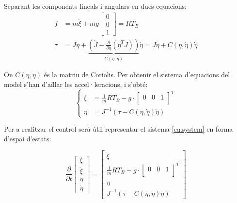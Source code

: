 \documentclass[twoside]{article}
\begin{document}
Separant les components lineals i angulars en dues equacions:
\begin{align}
f & = m \ddot{\xi} + mg \left[ \begin{array}{c}
0 \\
0 \\
1
\end{array} \right] =RT_B\\
\tau & =J \ddot{\eta} +  \underbrace{\left( \dot{J} - \frac{\partial}{\partial \dot{\eta}}(\dot{\eta}^{T}J)\right)}_{C(\eta,\dot{\eta})} \dot{\eta} =J \ddot{\eta} +  C(\eta,\dot{\eta})\dot{\eta} 
\end{align}

On $C(\eta,\dot{\eta})$ és la matriu de Coriolis. 
Per obtenir el sistema d'equacions del model s'han d'aïllar les accel·leracions, i s'obté:
\begin{equation}
\begin{cases}
\ddot{\xi} & =\frac{1}{m}RT_{B} - g \cdot \left[ \begin{array}{ccc}
0 & 0 & 1\\
\end{array} \right]^{T} \\
\ddot{\eta} & =J^{-1} \left( \tau - C(\eta,\dot{\eta})\dot{\eta}  \right)
\end{cases}
\label{eq:system}
\end{equation}

Per a realitzar el control será útil representar el sistema \ref{eq:system} en forma d'espai d'estats:

\begin{equation}
\frac{\partial}{\partial t}\left[ \begin{array}{l}
\xi \\
\dot{\xi} \\
\eta \\
\dot{\eta} 
\end{array} \right] =\left[ \begin{array}{l}
\dot{\xi} \\
\frac{1}{m}RT_{B} - g \cdot \left[ \begin{array}{ccc}
0 & 0 & 1 \\
\end{array} \right]^{T} \\
\dot{\eta} \\
J^{-1} \left( \tau - C(\eta,\dot{\eta})\dot{\eta} \right)
\end{array} \right]
\end{equation}
\end{document}
